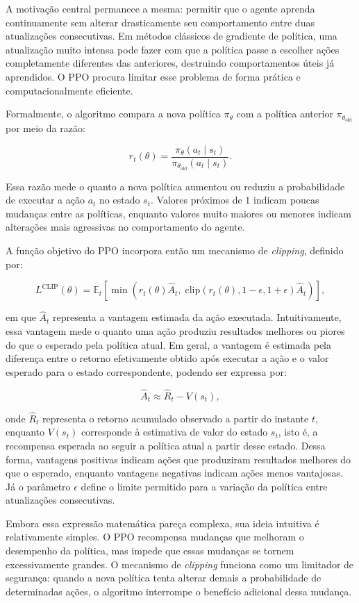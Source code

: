 A motivação central permanece a mesma: permitir que o agente aprenda continuamente sem alterar drasticamente seu comportamento entre duas atualizações consecutivas. Em métodos clássicos de gradiente de política, uma atualização muito intensa pode fazer com que a política passe a escolher ações completamente diferentes das anteriores, destruindo comportamentos úteis já aprendidos. O PPO procura limitar esse problema de forma prática e computacionalmente eficiente.

Formalmente, o algoritmo compara a nova política $\pi_\theta$ com a política anterior $\pi_{\theta_{\text{old}}}$ por meio da razão:

$$
r_t(\theta)
=
\frac{\pi_\theta(a_t \mid s_t)}
{\pi_{\theta_{\text{old}}}(a_t \mid s_t)}.
$$

Essa razão mede o quanto a nova política aumentou ou reduziu a probabilidade de executar a ação $a_t$ no estado $s_t$. Valores próximos de $1$ indicam poucas mudanças entre as políticas, enquanto valores muito maiores ou menores indicam alterações mais agressivas no comportamento do agente.

A função objetivo do PPO incorpora então um mecanismo de \textit{clipping}, definido por:

$$
L^{\text{CLIP}}(\theta)
=
\mathbb{E}_t
\left[
\min
\left(
r_t(\theta)\hat{A}_t,
\;
\text{clip}(r_t(\theta),1-\epsilon,1+\epsilon)\hat{A}_t
\right)
\right],
$$

\noindent em que $\hat{A}_t$ representa a vantagem estimada da ação executada. Intuitivamente, essa vantagem mede o quanto uma ação produziu resultados melhores ou piores do que o esperado pela política atual. Em geral, a vantagem é estimada pela diferença entre o retorno efetivamente obtido após executar a ação e o valor esperado para o estado correspondente, podendo ser expressa por:

$$
\hat{A}_t \approx \hat{R}_t - V(s_t),
$$

\noindent onde $\hat{R}_t$ representa o retorno acumulado observado a partir do instante $t$, enquanto $V(s_t)$ corresponde à estimativa de valor do estado $s_t$, isto é, a recompensa esperada ao seguir a política atual a partir desse estado. Dessa forma, vantagens positivas indicam ações que produziram resultados melhores do que o esperado, enquanto vantagens negativas indicam ações menos vantajosas. Já o parâmetro $\epsilon$ define o limite permitido para a variação da política entre atualizações consecutivas.

Embora essa expressão matemática pareça complexa, sua ideia intuitiva é relativamente simples. O PPO recompensa mudanças que melhoram o desempenho da política, mas impede que essas mudanças se tornem excessivamente grandes. O mecanismo de \textit{clipping} funciona como um limitador de segurança: quando a nova política tenta alterar demais a probabilidade de determinadas ações, o algoritmo interrompe o benefício adicional dessa mudança.

